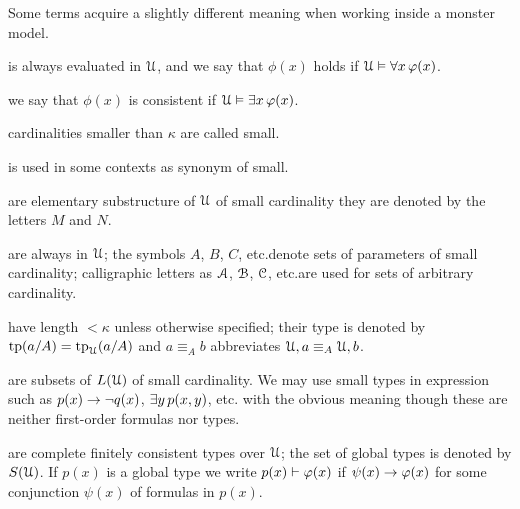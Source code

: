 Some terms acquire a slightly different meaning when working inside a monster model.

\newcommand{\labellalunga}[1]{#1\hfill}
\newenvironment{litemize}[1]
   {\begin{list}{}{
   \setlength{\parskip}{0mm}
   \setlength{\topsep}{5mm}
   \setlength{\partopsep}{0mm}
   \setlength{\rightmargin}{0mm}
   \setlength{\listparindent}{0mm}
   \setlength{\itemindent}{0mm}
   \setlength{\itemsep}{1mm}
   \settowidth{\labelwidth}{#1}
   \setlength{\parsep}{0mm}
   \setlength{\partopsep}{0mm}
   \setlength{\labelsep}{3mm}
   \setlength{\leftmargin}{\labelwidth+\labelsep}
   \let\makelabel\labellalunga}}{
   \end{list}}

\begin{litemize}{type-definable}
\item[\emph{truth}] is always evaluated in $\EuScript U$, and we say that $\phi(x)$ holds if $\EuScript U\vDash\forall x\,\varphi(x)$.
\item[\emph{consistency}] we say that $\phi(x)$ is consistent if $\EuScript U\vDash\exists x\,\varphi(x)$.
\item[\emph{small/large}] cardinalities smaller than $\kappa$ are called small.
\item[\emph{bounded}] is used in some contexts as synonym of small.
\item[\emph{models}] are elementary substructure of $\EuScript U$ of small cardinality they are denoted by the letters $M$ and $N$.
\item[\emph{parameters}] are always in $\EuScript U$; the symbols $A$, $B$, $C$, etc.\@ denote sets of parameters of small cardinality; calligraphic letters as $\EuScript A$, $\EuScript B$, $\EuScript C$, etc.\@ are used for sets of arbitrary cardinality.
\item[\emph{tuples}] have length $<\kappa$ unless otherwise specified; their type is denoted by ${\rm tp}(a/A)={\rm tp}_\EuScript U(a/A)$ and $a\equiv_A b$ abbreviates $\EuScript U,a \equiv_A \EuScript U,b$.
\item[\emph{small types}] are subsets of $L(\EuScript U)$ of small cardinality.
We may use small types in expression such as $p(x)\rightarrow\neg q(x)$, $\exists y\,p(x,y)$, etc. with the obvious meaning though these are neither first-order formulas nor types.
\item[\emph{global types}] are complete finitely consistent types over $\EuScript U$; the set of global types is denoted by $S(\EuScript U)$. If $p(x)$ is a global type we write $p(x)\vdash\varphi(x)$ if $\psi(x)\rightarrow\varphi(x)$ for some conjunction $\psi(x)$ of formulas in $p(x)$.

\end{litemize}
